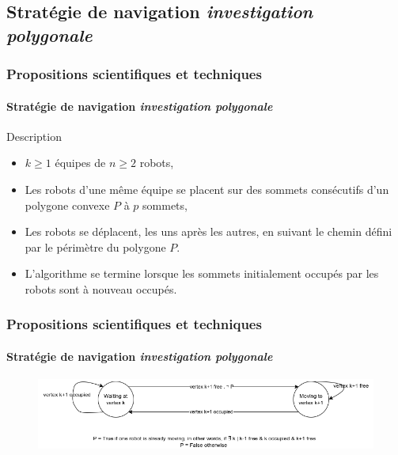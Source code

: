 \documentclass{beamer}
\begin{document}
		\subsection{Stratégie de navigation \textit{investigation polygonale}}
			\begin{frame}
				\frametitle{Propositions scientifiques et techniques}
				\framesubtitle{Stratégie de navigation \textit{investigation polygonale}}
				\begin{block}{Description}
					\begin{itemize}
						\item $k \ge 1$ équipes de $n \ge 2$ robots,
						\item Les robots d'une même équipe se placent sur des sommets consécutifs d'un polygone convexe $P$ à $p$ sommets,
						\item Les robots se déplacent, les uns après les autres, en suivant le chemin défini par le périmètre du polygone $P$.
						\item L'algorithme se termine lorsque les sommets initialement occupés par les robots sont à nouveau occupés.
					\end{itemize}
				\end{block}
			\end{frame}
			\begin{frame}
				\frametitle{Propositions scientifiques et techniques}
				\framesubtitle{Stratégie de navigation \textit{investigation polygonale}}
				\begin{figure}
					\centering
					\includegraphics[width=1.0\textwidth]{graphics/automat_poly.png}
				\end{figure}
			\end{frame}
\end{document}
